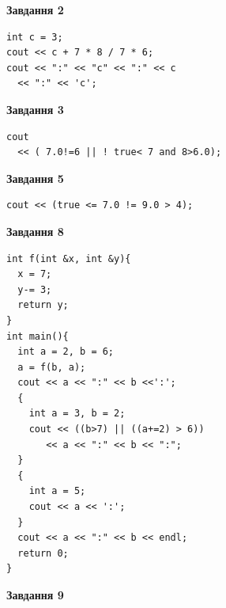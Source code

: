 \documentclass[12pt, ukrainian]{article}
\begin{document}
{\begin {large}
\begin{minipage}[t]{7.0cm}
\end{minipage}
\vline \hspace{1mm}
\begin{minipage}[t]{11.0cm}

\begin{center}
\textbf{Завдання 2}
\end{center}
\vspace{-8mm}

\begin{verbatim}
int c = 3;
cout << c + 7 * 8 / 7 * 6;
cout << ":" << "c" << ":" << c 
  << ":" << 'c';
\end{verbatim}



\begin{center}
\textbf{Завдання 3}
\end{center}
\vspace{-8mm}

\begin{verbatim}
cout 
  << ( 7.0!=6 || ! true< 7 and 8>6.0);
\end{verbatim}



\begin{center}
\textbf{Завдання 5}
\end{center}
\vspace{-8mm}

\begin{verbatim}
cout << (true <= 7.0 != 9.0 > 4);
\end{verbatim}



\begin{center}
\textbf{Завдання 8}
\end{center}
\vspace{-8mm}

\begin{verbatim}
int f(int &x, int &y){
  x = 7;
  y-= 3;
  return y;
}
int main(){
  int a = 2, b = 6;
  a = f(b, a);
  cout << a << ":" << b <<':';
  {
    int a = 3, b = 2;
    cout << ((b>7) || ((a+=2) > 6))
       << a << ":" << b << ":";
  }
  {
    int a = 5;
    cout << a << ':';
  }
  cout << a << ":" << b << endl;
  return 0;
}
\end{verbatim}

\end{minipage}


\begin{minipage}[t]{7.0cm}

\begin{center}
\textbf{Завдання 9}
\end{center}
\vspace{-8mm}


\end{minipage}
\end{large}}
\end{document}
